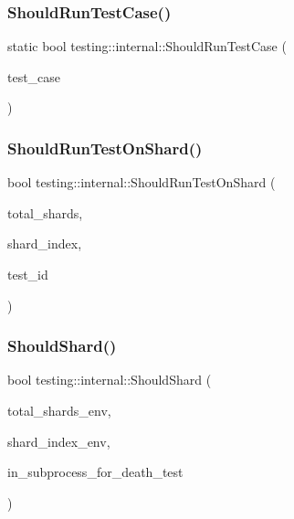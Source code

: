 \mbox{\label{namespacetesting_1_1internal_a73e562dfef3eb7b30dfbb7b5e88e6df2}} 
\subsubsection{\texorpdfstring{ShouldRunTestCase()}{ShouldRunTestCase()}}
{\footnotesize\ttfamily static bool testing\+::internal\+::\+Should\+Run\+Test\+Case (\begin{DoxyParamCaption}\item[{const \mbox{\hyperlink{classtesting_1_1TestCase}{Test\+Case}} $\ast$}]{test\+\_\+case }\end{DoxyParamCaption})\hspace{0.3cm}{\ttfamily [static]}}

\mbox{\label{namespacetesting_1_1internal_a437bd89f5bc532778d7467600e210395}} 
\subsubsection{\texorpdfstring{ShouldRunTestOnShard()}{ShouldRunTestOnShard()}}
{\footnotesize\ttfamily bool testing\+::internal\+::\+Should\+Run\+Test\+On\+Shard (\begin{DoxyParamCaption}\item[{int}]{total\+\_\+shards,  }\item[{int}]{shard\+\_\+index,  }\item[{int}]{test\+\_\+id }\end{DoxyParamCaption})}

\mbox{\label{namespacetesting_1_1internal_a8688e48645d951b8e42b61d2e4b2890e}} 
\subsubsection{\texorpdfstring{ShouldShard()}{ShouldShard()}}
{\footnotesize\ttfamily bool testing\+::internal\+::\+Should\+Shard (\begin{DoxyParamCaption}\item[{const char $\ast$}]{total\+\_\+shards\+\_\+env,  }\item[{const char $\ast$}]{shard\+\_\+index\+\_\+env,  }\item[{bool}]{in\+\_\+subprocess\+\_\+for\+\_\+death\+\_\+test }\end{DoxyParamCaption})}

